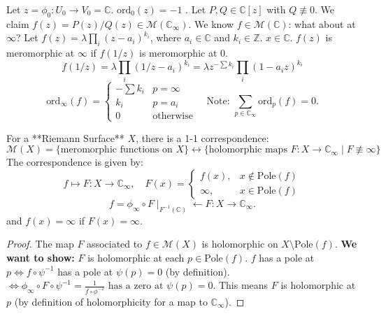 \documentclass{article}
\begin{document}
\begin{example} 
Let $z=\phi_0: U_0 \to V_0 = \mathbb{C}$. $\text{ord}_0(z) = -1$ .
Let $P, Q \in \mathbb{C}[z]$ with $Q \not\equiv 0$. We claim $f(z) = P(z)/Q(z) \in \mathcal{M}(\mathbb{C}_{\infty})$.
We know $f \in \mathcal{M}(\mathbb{C})$: what about at $\infty$?
Let $f(z) = \lambda \prod_{i} (z-a_i)^{k_i}$, where $a_i \in \mathbb{C}$ and $k_i \in \mathbb{Z}$. $x \in \mathbb{C}$.
$f(z)$ is meromorphic at $\infty$ if $f(1/z)$ is meromorphic at $0$.
$$
f(1/z) =\lambda \prod_{i} (1/z - a_i)^{k_i} = \lambda z^{-\sum k_i} \prod_{i}  (1 - a_i z)^{k_i}
$$
$$
\text{ord}_{\infty}(f) =
\left\{
\begin{array}{ll}
-\sum k_i & p=\infty \\
k_i & p=a_i \\
0 & \text{otherwise}
\end{array}
\right.
\quad \text{Note: } \sum_{p \in \mathbb{C}_{\infty}} \text{ord}_p(f) = 0.
$$
\end{example}

\begin{theorem}  
For a **Riemann Surface** $X$, there is a 1-1 correspondence:
$$
\mathcal{M}(X) = \{ \text{meromorphic functions on } X \} \longleftrightarrow \{ \text{holomorphic maps } F: X \to \mathbb{C}_{\infty} \mid F \not \equiv \infty \}
$$
The correspondence is given by:
$$
f \longmapsto F: X \to \mathbb{C}_{\infty}, \quad F(x) =
\left\{
\begin{array}{ll}
f(x), & x \notin \text{Pole}(f) \\
\infty, & x \in \text{Pole}(f)
\end{array}
\right.
$$
$$
f = \phi_{\infty} \circ F \mid_{F^{-1}(\mathbb{C})} \longleftarrow F: X \to \mathbb{C}_{\infty}.
$$
and $f(x)=\infty$ if $F(x)=\infty$.
\end{theorem}

\begin{proof}
The map $F$ associated to $f \in \mathcal{M}(X)$ is holomorphic on $X \setminus \text{Pole}(f)$.
\textbf{We want to show:} $F$ is holomorphic at each $p \in \text{Pole}(f)$.
$f$ has a pole at $p \iff f \circ \psi^{-1}$ has a pole at $\psi(p)=0$ (by definition).\\
$\iff \phi_{\infty} \circ F \circ \psi^{-1} = \frac{1}{f \circ \phi^{-1}} \text{ has a zero at } \psi(p) = 0.$
This means $F$ is holomorphic at $p$ (by definition of holomorphicity for a map to $\mathbb{C}_{\infty}$).
\end{proof}
\end{document}
